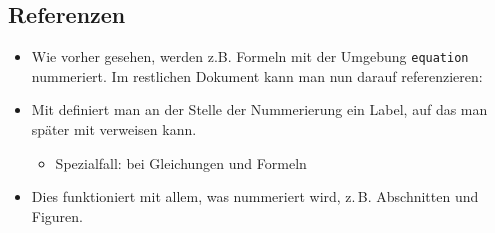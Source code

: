 \subsection{Referenzen}

\begin{frame}[fragile]{\subsecname}
    \begin{itemize}
        \item Wie vorher gesehen, werden z.B. Formeln mit der Umgebung \texttt{equation} nummeriert.
            Im restlichen Dokument kann man nun darauf \alert{referenzieren}:
        \item Mit \code{\label{<name>}} definiert man an der Stelle der Nummerierung ein
            \alert{Label}, auf das man später mit \code{\ref{<name>}} verweisen kann.
            \begin{itemize}
                \item Spezialfall: \code{\eqref{<name>}} bei Gleichungen und Formeln
            \end{itemize}
        \item Dies funktioniert mit allem, was nummeriert wird, z.\,B. Abschnitten und Figuren.
    \end{itemize}
\end{frame}
